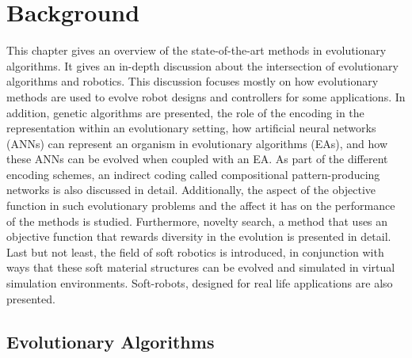 
\chapter{Background} %

\label{Background} %


This chapter gives an overview of the state-of-the-art methods in evolutionary algorithms. It gives an in-depth discussion about the intersection of evolutionary algorithms and robotics. This discussion focuses mostly on how evolutionary methods are used to evolve robot designs and controllers for some applications. In addition, genetic algorithms are presented, the role of the encoding in the representation within an evolutionary setting,  how artificial neural networks (ANNs) can represent an organism in evolutionary algorithms (EAs), and how these ANNs can be evolved when coupled with an EA. As part of the different encoding schemes, an indirect coding called compositional pattern-producing networks is also discussed in detail. Additionally, the aspect of the objective function in such evolutionary problems and the affect it has on the performance of the methods is studied. Furthermore, novelty search, a method that uses an objective function that rewards diversity in the evolution is presented in detail. Last but not least, the field of soft robotics  is introduced, in conjunction with ways that these soft material structures can be evolved and simulated in virtual simulation environments. Soft-robots, designed for real life applications are also presented.




\section{Evolutionary Algorithms}

